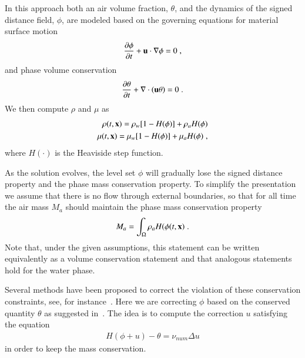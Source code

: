 \documentclass[final,3p,times]{elsarticle}
\begin{document}
In this approach both an air volume fraction, $\theta$, and the dynamics of the signed distance field, $\phi$, are modeled based on the governing equations for material surface motion
\begin{align}
\label{eq:ls_transport_1}
   \frac{\partial \phi}{\partial t} + \mathbf{u}\cdot\nabla\phi = 0 \; ,
\end{align}
and phase volume conservation
\begin{align}
\label{eq:ls_transport_2}
   \frac{\partial \theta}{\partial t} + \nabla\cdot(\mathbf{u}\theta) = 0 \; .
\end{align}
We then compute $\rho$ and $\mu$ as 
\begin{align}
\label{eq:two_phase_rho}
   \rho(t,\mathbf{x}) = \rho_w [1-H(\phi)] + \rho_a H(\phi)\\
\label{eq:two_phase_nu}
   \mu(t,\mathbf{x}) = \mu_w [1-H(\phi)] + \mu_a H(\phi) \; ,
\end{align}
where $H(\cdot)$ is the Heaviside step function. 

As the solution evolves, the level set $\phi$ will gradually lose the signed distance property and the phase mass conservation property. To simplify the presentation we assume that there is no flow through external boundaries, so that for all time the air mass $M_a$ should maintain the phase mass conservation property
\begin{equation}
M_a = \int_{\Omega} \rho_a H(\phi(t,\mathbf{x}) \; .
\end{equation}
Note that, under the given assumptions, this statement can be written equivalently as a volume conservation statement and that analogous statements hold for the water phase.

Several methods have been proposed to correct the violation of these conservation constraints, see, for instance~\cite{Sussman2000,PSVW2004}. 
Here we are correcting $\phi$ based on the conserved quantity $\theta$ as suggested in~\cite{KAFB11}. The idea is to compute the correction $u$ satisfying the equation
\begin{align}
\label{eq:mass_correction}
   H(\phi+u) - \theta = \nu_{num} \Delta u 
\end{align}
in order to keep the mass conservation. %
\end{document}
